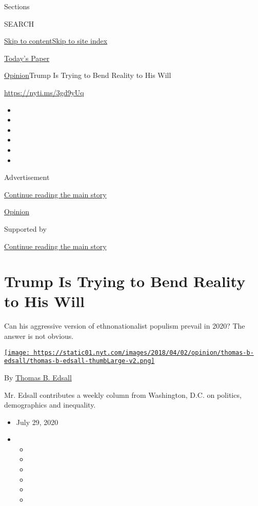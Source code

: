 Sections

SEARCH

\protect\hyperlink{site-content}{Skip to
content}\protect\hyperlink{site-index}{Skip to site index}

\href{https://myaccount.nytimes.com/auth/login?response_type=cookie\&client_id=vi}{}

\href{https://www.nytimes.com/section/todayspaper}{Today's Paper}

\href{/section/opinion}{Opinion}\textbar{}Trump Is Trying to Bend
Reality to His Will

\url{https://nyti.ms/3gd9yUq}

\begin{itemize}
\item
\item
\item
\item
\item
\item
\end{itemize}

Advertisement

\protect\hyperlink{after-top}{Continue reading the main story}

\href{/section/opinion}{Opinion}

Supported by

\protect\hyperlink{after-sponsor}{Continue reading the main story}

\hypertarget{trump-is-trying-to-bend-reality-to-his-will}{%
\section{Trump Is Trying to Bend Reality to His
Will}\label{trump-is-trying-to-bend-reality-to-his-will}}

Can his aggressive version of ethnonationalist populism prevail in 2020?
The answer is not obvious.

\href{https://www.nytimes.com/by/thomas-b-edsall}{\texttt{[image: https://static01.nyt.com/images/2018/04/02/opinion/thomas-b-edsall/thomas-b-edsall-thumbLarge-v2.png]}}

By \href{https://www.nytimes.com/by/thomas-b-edsall}{Thomas B. Edsall}

Mr. Edsall contributes a weekly column from Washington, D.C. on
politics, demographics and inequality.

\begin{itemize}
\item
  July 29, 2020
\item
  \begin{itemize}
  \item
  \item
  \item
  \item
  \item
  \item
  \end{itemize}
\end{itemize}

